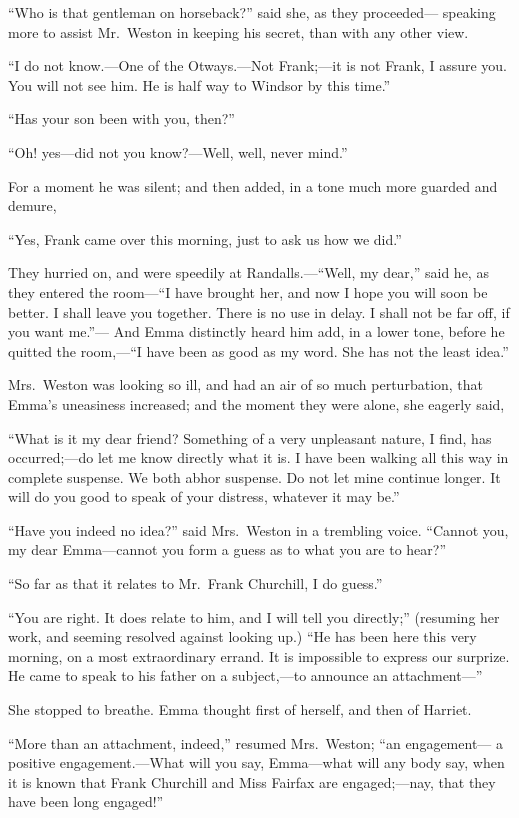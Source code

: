 ``Who is that gentleman on horseback?'' said she, as they proceeded---%
speaking more to assist Mr.\ Weston in keeping his secret, than with
any other view.

``I do not know.---One of the Otways.---Not Frank;---it is not Frank,
I assure you.  You will not see him.  He is half way to Windsor
by this time.''

``Has your son been with you, then?''

``Oh! yes---did not you know?---Well, well, never mind.''

For a moment he was silent; and then added, in a tone much more
guarded and demure,

``Yes, Frank came over this morning, just to ask us how we did.''

They hurried on, and were speedily at Randalls.---``Well, my dear,''
said he, as they entered the room---``I have brought her, and now
I hope you will soon be better.  I shall leave you together.
There is no use in delay.  I shall not be far off, if you want me.''---%
And Emma distinctly heard him add, in a lower tone, before he
quitted the room,---``I have been as good as my word.  She has not the
least idea.''

Mrs.\ Weston was looking so ill, and had an air of so much perturbation,
that Emma's uneasiness increased; and the moment they were alone,
she eagerly said,

``What is it my dear friend?  Something of a very unpleasant nature,
I find, has occurred;---do let me know directly what it is.
I have been walking all this way in complete suspense.  We both
abhor suspense.  Do not let mine continue longer.  It will do you
good to speak of your distress, whatever it may be.''

``Have you indeed no idea?'' said Mrs.\ Weston in a trembling voice.
``Cannot you, my dear Emma---cannot you form a guess as to what you
are to hear?''

``So far as that it relates to Mr.\ Frank Churchill, I do guess.''

``You are right.  It does relate to him, and I will tell you directly;''
(resuming her work, and seeming resolved against looking up.)
``He has been here this very morning, on a most extraordinary errand.
It is impossible to express our surprize.  He came to speak to his
father on a subject,---to announce an attachment---''

She stopped to breathe.  Emma thought first of herself, and then
of Harriet.

``More than an attachment, indeed,'' resumed Mrs.\ Weston; ``an engagement---%
a positive engagement.---What will you say, Emma---what will any
body say, when it is known that Frank Churchill and Miss Fairfax
are engaged;---nay, that they have been long engaged!''

